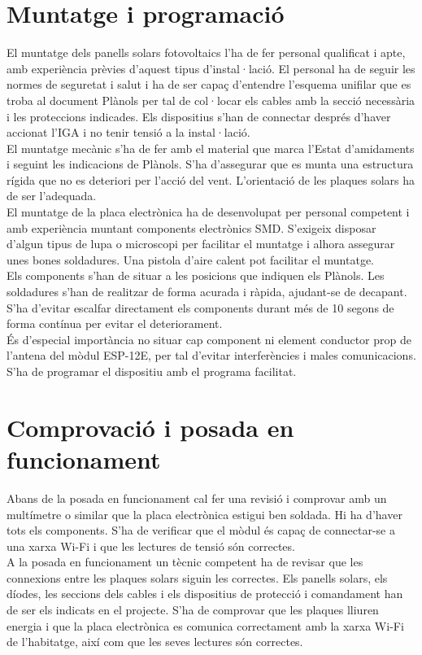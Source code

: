 \section{Muntatge i programació}
El muntatge dels panells solars fotovoltaics l'ha de fer personal qualificat i apte, amb experiència prèvies d'aquest tipus d'instal·lació. El personal ha de seguir les normes de seguretat i salut i ha de ser capaç d'entendre l'esquema unifilar que es troba al document Plànols per tal de col·locar els cables amb la secció necessària i les proteccions indicades. Els dispositius s'han de connectar després d'haver accionat l'IGA i no tenir tensió a la instal·lació.\\
\newline El muntatge mecànic s'ha de fer amb el material que marca l'Estat d'amidaments i seguint les indicacions de Plànols. S'ha d'assegurar que es munta una estructura rígida que no es deteriori per l'acció del vent. L'orientació de les plaques solars ha de ser l'adequada.\\
\newline El muntatge de la placa electrònica ha de desenvolupat per personal competent i amb experiència muntant components electrònics SMD. S'exigeix disposar d'algun tipus de lupa o microscopi per facilitar el muntatge i alhora assegurar unes bones soldadures. Una pistola d'aire calent pot facilitar el muntatge.\\
\newline Els components s'han de situar a les posicions que indiquen els Plànols. Les soldadures s'han de realitzar de forma acurada i ràpida, ajudant-se de decapant. S'ha d'evitar escalfar directament els components durant més de 10 segons de forma contínua per evitar el deteriorament.\\
\newline És d'especial importància no situar cap component ni element conductor prop de l'antena del mòdul ESP-12E, per tal d'evitar interferències i males comunicacions.\\
\newline S'ha de programar el dispositiu amb el programa facilitat.

\section{Comprovació i posada en funcionament}
Abans de la posada en funcionament cal fer una revisió i comprovar amb un multímetre o similar que la placa electrònica estigui ben soldada. Hi ha d'haver tots els components. S'ha de verificar que el mòdul és capaç de connectar-se a una xarxa Wi-Fi i que les lectures de tensió són correctes.\\
\newline A la posada en funcionament un tècnic competent ha de revisar que les connexions entre les plaques solars siguin les correctes. Els panells solars, els díodes, les seccions dels cables i els dispositius de protecció i comandament han de ser els indicats en el projecte. S'ha de comprovar que les plaques lliuren energia i que la placa electrònica es comunica correctament amb la xarxa Wi-Fi de l'habitatge, així com que les seves lectures són correctes.


